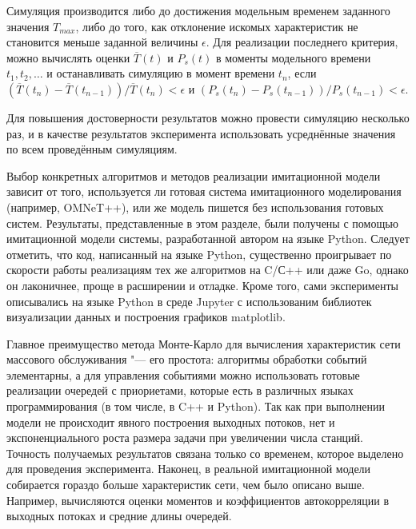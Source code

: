 Симуляция производится либо до достижения модельным временем заданного значения $T_{max}$, либо до того, как отклонение искомых характеристик не становится меньше заданной величины $\epsilon$. Для реализации последнего критерия, можно вычислять оценки $\overline{T}(t)$ и $P_s(t)$ в моменты модельного времени $t_1, t_2, \dots$ и останавливать симуляцию в момент времени $t_n$, если $\left(\overline{T}(t_n) - \overline{T}(t_{n-1}) \right) / \overline{T}(t_n) < \epsilon$ и $\left( P_s(t_n) - P_s(t_{n-1}) \right) / P_s(t_{n-1}) < \epsilon$.

Для повышения достоверности результатов можно провести симуляцию несколько раз, и в качестве результатов эксперимента использовать усреднённые значения по всем проведённым симуляциям.

Выбор конкретных алгоритмов и методов реализации имитационной модели зависит от того, используется ли готовая система имитационного моделирования (например, OMNeT++), или же модель пишется без использования готовых систем. Результаты, представленные в этом разделе, были получены с помощью имитационной модели системы, разработанной автором на языке Python. Следует отметить, что код, написанный на языке Python, существенно проигрывает по скорости работы реализациям тех же алгоритмов на C/С++ или даже Go, однако он лаконичнее, проще в расширении и отладке. Кроме того, сами эксперименты описывались на языке Python в среде Jupyter с использованим библиотек визуализации данных и построения графиков matplotlib.


Главное преимущество метода Монте-Карло для вычисления характеристик сети массового обслуживания "--- его простота: алгоритмы обработки событий элементарны, а для управления событиями можно использовать готовые реализации очередей с приориетами, которые есть в различных языках программирования (в том числе, в C++ и Python). Так как при выполнении модели не происходит явного построения выходных потоков, нет и экспоненциального роста размера задачи при увеличении числа станций. Точность получаемых результатов связана только со временем, которое выделено для проведения эксперимента. Наконец, в реальной имитационной модели собирается гораздо больше характеристик сети, чем было описано выше. Например, вычисляются оценки моментов и коэффициентов автокорреляции в выходных потоках и средние длины очередей.

